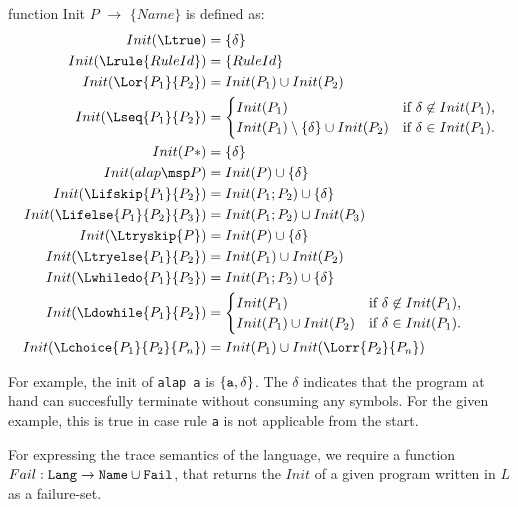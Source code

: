 \begin{definition}
function Init $P$ $\rightarrow$ $\{ Name \}$ is defined as:\\
\begin{align*}
Init(\Ltrue) &= \{ \delta \}\\
Init(\Lrule{RuleId}) &= \{RuleId\}\\
Init(\Lor{P_1}{P_2}) &= Init(P_1) \cup Init(P_2)\\
Init(\Lseq{P_1}{P_2}) &= \begin{cases}
	Init(P_1)& \text{if $\delta \not\in Init(P_1)$,}\\
	Init(P_1) \setminus \{ \delta \} \cup Init(P_2) & \text{if $\delta \in Init(P_1)$.}\\
\end{cases}\\
Init(P*) &= \{ \delta \}\\
Init(alap \msp P) &= Init(P) \cup \{ \delta \}\\
Init(\Lifskip{P_1}{P_2}) &= Init(P_1;P_{2}) \cup \{\delta\}\\
Init(\Lifelse{P_1}{P_2}{P_3}) &= Init(P_1;P_{2}) \cup Init(P_{3})\\
Init(\Ltryskip{P}) &= Init(P) \cup \{ \delta \}\\
Init(\Ltryelse{P_{1}}{P_{2}}) &= Init(P_{1}) \cup Init(P_{2})\\
Init(\Lwhiledo{P_1}{P_2}) &= Init(P_1;P_2) \cup \{ \delta \}\\
Init(\Ldowhile{P_1}{P_2}) &= \begin{cases}
	Init(P_1) & \text{if $\delta \not\in Init(P_1)$,}\\
	Init(P_1) \cup Init(P_2) & \text{if $\delta \in Init(P_1)$.}\\
\end{cases}\\
Init(\Lchoice{P_1}{P_2}{P_n}) &= Init(P_1) \cup Init(\Lorr{P_2}{P_n})\\
\end{align*}
\end{definition}

For example, the init of {\tt alap a}  is $\{ {\tt a}, \delta \}$. The $\delta$ indicates that the program at hand can succesfully terminate without consuming any symbols. For the given example, this is true in case rule {\tt a} is not applicable from the start.

For expressing the trace semantics of the language, we require a function $Fail: {\tt Lang} \rightarrow \text{\tt Name} \cup \text{\tt Fail}$, that returns  
the $Init$ of a given program written in $L$ as a failure-set.

